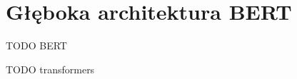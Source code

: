\section{Głęboka architektura BERT}

TODO \cite{devlin2018bert} BERT

TODO \cite{wolf2019huggingfaces} transformers

